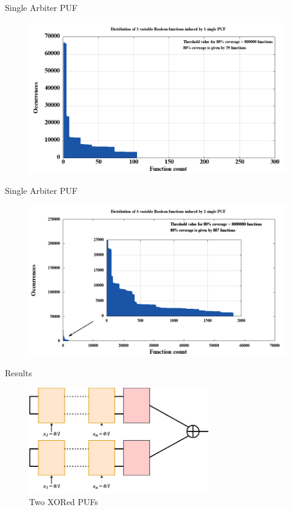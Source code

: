 \documentclass[10pt, compress]{beamer}
\begin{document}
\begin{frame}{Single Arbiter PUF}
    \begin{figure}
        \centering
        \includegraphics[width=\textwidth]{figures/sorted/distribution_of_3-variable_boolean_functions_induced_by_1_single_puf.png}
    \end{figure}
\end{frame}

\begin{frame}{Single Arbiter PUF}
    \begin{figure}
        \centering
        \includegraphics[width=\textwidth]{figures/zoom/distribution_of_4-variable_boolean_functions_induced_by_1_single_puf_zoom.png}
    \end{figure}
\end{frame}


\begin{frame}{Results}
    \begin{figure}
        \centering
        \includegraphics[width=0.7\textwidth]{figures/puf_2_xor.pdf}
        \caption{Two XORed PUFs}
    \end{figure}
\end{frame}
\end{document}
